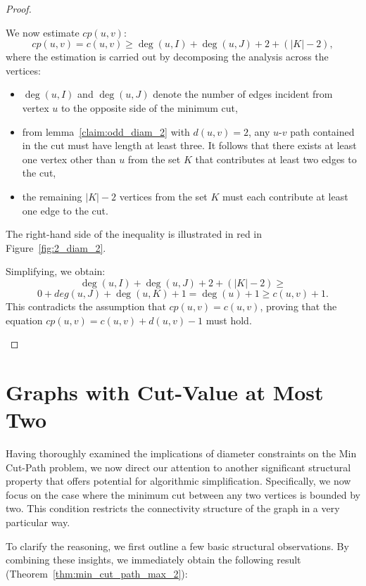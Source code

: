 \documentclass[journal ]{new-aiaa}
\numberwithin{equation}{section}
\theoremstyle{definition}
\theoremstyle{plain}
\theoremstyle{remark}
\begin{document}
\begin{proof}
\begin{enumerate}
We now estimate \(cp(u, v)\):
\[
cp(u, v) = c(u,v)\geq \deg(u, I) + \deg(u, J) + 2 + (|K| - 2),
\]
where the estimation is carried out by decomposing the analysis across the vertices:
\begin{itemize}
    \item \(\deg(u, I)\) and \(\deg(u, J)\) denote the number of edges incident from vertex \(u\) to the opposite side of the minimum cut,
    
    \item  from lemma~\ref{claim:odd_diam_2} with \(d(u,v)=2\), any \(u\)-\(v\) path contained in the cut must have length at least three. It follows that there exists at least one vertex other than \(u\) from the set \(K\) that contributes at least two edges to the cut,

    \item the remaining \(|K| - 2\) vertices from the set \(K\) must each contribute at least one edge to the cut.
\end{itemize}


The right-hand side of the inequality is illustrated in red in Figure~\ref{fig:2_diam_2}. 

Simplifying, we obtain:
\[
\deg(u, I) + \deg(u, J) + 2 + (|K| - 2) \geq 
\]
\[
0 +deg(u, J)  + \deg(u, K) + 1 = \deg(u) + 1 \geq c(u, v) + 1.
\]
This contradicts the assumption that \(cp(u, v) = c(u, v)\), proving that the equation \(cp(u, v) = c(u, v) + d(u, v) - 1\) must hold.
\end{enumerate}
\end{proof}



\section{Graphs with Cut-Value at Most Two}
\label{sec:cut_two}

Having thoroughly examined the implications of diameter constraints on the Min Cut-Path problem, we now direct our attention to another significant structural property that offers potential for algorithmic simplification. Specifically, we now focus on the case where the minimum cut between any two vertices is bounded by two. This condition restricts the connectivity structure of the graph in a very particular way.

To clarify the reasoning, we first outline a few basic structural observations. By combining these insights, we immediately obtain the following result (Theorem~\ref{thm:min_cut_path_max_2}):
\end{document}
